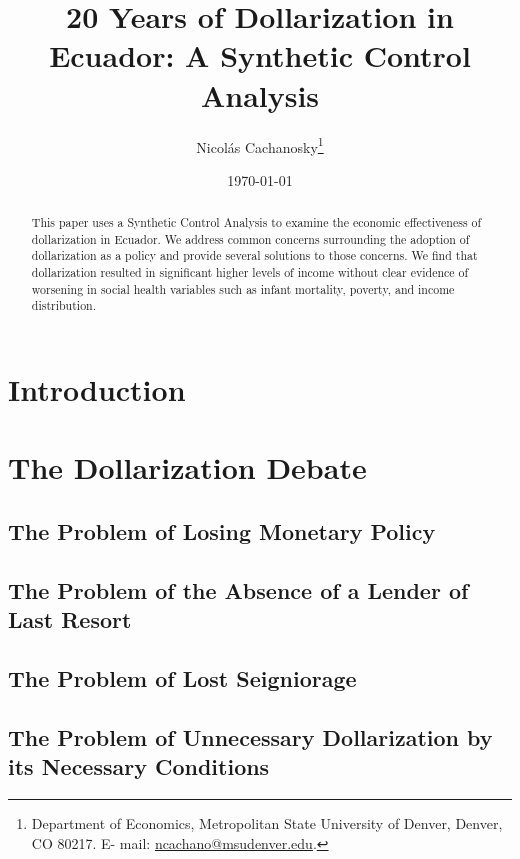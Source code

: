 \documentclass[11pt]{article}
\title{20 Years of Dollarization in Ecuador: A Synthetic Control Analysis}
\author{Nicolás Cachanosky\thanks{Department of Economics, Metropolitan State University of Denver, Denver, CO 80217. E- mail: \href{mailto:ncachano@msudenver.edu}{ncachano@msudenver.edu}.}}
\date{\today}
\begin{document}
\doublespacing


\maketitle

\begin{abstract}
\noindent
This paper uses a Synthetic Control Analysis to examine the economic effectiveness of dollarization in Ecuador. We address common concerns surrounding the adoption of dollarization as a policy and provide several solutions to those concerns. We find that dollarization resulted in significant higher levels of income without clear evidence of worsening in social health variables such as infant mortality, poverty, and income distribution.
\end{abstract}

\newpage

\section{Introduction} 


\section{The Dollarization Debate}

\subsection{The Problem of Losing Monetary Policy}

\subsection{The Problem of the Absence of a Lender of Last Resort}

\subsection{The Problem of Lost Seigniorage}

\subsection{The Problem of Unnecessary Dollarization by its Necessary Conditions}
\end{document}
